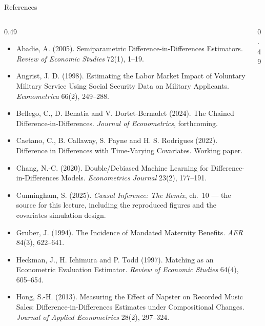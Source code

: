 \documentclass[
  11pt,
  ignorenonframetext,
  aspectratio=169,
]{beamer}
\providecommand{\tightlist}{%
  \setlength{\itemsep}{0pt}\setlength{\parskip}{0pt}}
\begin{document}
\begin{frame}{References}
\protect{}\label{references}
\begin{columns}[T]
\begin{column}{0.49\linewidth}
\tiny

\begin{itemize}
\tightlist
\item
  Abadie, A. (2005). Semiparametric Difference-in-Differences
  Estimators. \emph{Review of Economic Studies} 72(1), 1--19.
\item
  Angrist, J. D. (1998). Estimating the Labor Market Impact of Voluntary
  Military Service Using Social Security Data on Military Applicants.
  \emph{Econometrica} 66(2), 249--288.
\item
  Bellego, C., D. Benatia and V. Dortet-Bernadet (2024). The Chained
  Difference-in-Differences. \emph{Journal of Econometrics},
  forthcoming.
\item
  Caetano, C., B. Callaway, S. Payne and H. S. Rodrigues (2022).
  Difference in Differences with Time-Varying Covariates. Working paper.
\item
  Chang, N.-C. (2020). Double/Debiased Machine Learning for
  Difference-in-Differences Models. \emph{Econometrics Journal} 23(2),
  177--191.
\item
  Cunningham, S. (2025). \emph{Causal Inference: The Remix}, ch.~10 ---
  the source for this lecture, including the reproduced figures and the
  covariates simulation design.
\item
  Gruber, J. (1994). The Incidence of Mandated Maternity Benefits.
  \emph{AER} 84(3), 622--641.
\item
  Heckman, J., H. Ichimura and P. Todd (1997). Matching as an
  Econometric Evaluation Estimator. \emph{Review of Economic Studies}
  64(4), 605--654.
\item
  Hong, S.-H. (2013). Measuring the Effect of Napster on Recorded Music
  Sales: Difference-in-Differences Estimates under Compositional
  Changes. \emph{Journal of Applied Econometrics} 28(2), 297--324.
\end{itemize}
\end{column}

\begin{column}{0.49\linewidth}
\tiny


\end{column}
\end{columns}
\end{frame}
\end{document}

